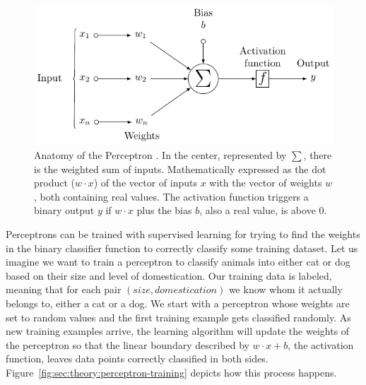 \begin{figure}[htb]
  \includegraphics[width=\textwidth]{tkz/perceptron}
  \caption{
    Anatomy of the Perceptron \cite{Medina2013}.
    In the center, represented by $\sum$, there is the weighted sum of inputs.
    Mathematically expressed as the dot product (${w}\cdot{x}$) of the vector of inputs $x$ with the vector of weights $w$, both containing real values.
    The activation function triggers a binary output $y$ if ${w}\cdot{x}$ plus the bias $b$, also a real value, is above $0$.
  }
  \label{fig:sec:theory:perceptron}
\end{figure}

Perceptrons can be trained with supervised learning for trying to find the weights in the binary classifier function to correctly classify some training dataset.
Let us imagine we want to train a perceptron to classify animals into either cat or dog based on their size and level of domestication.
Our training data is labeled, meaning that for each pair $(size, domestication)$ we know whom it actually belongs to, either a cat or a dog.
We start with a perceptron whose weights are set to random values and the first training example gets classified randomly.
As new training examples arrive, the learning algorithm will update the weights of the perceptron so that the linear boundary described by ${w}\cdot{x}+b$, the activation function, leaves data points correctly classified in both sides.
Figure~\ref{fig:sec:theory:perceptron-training} depicts how this process happens.

